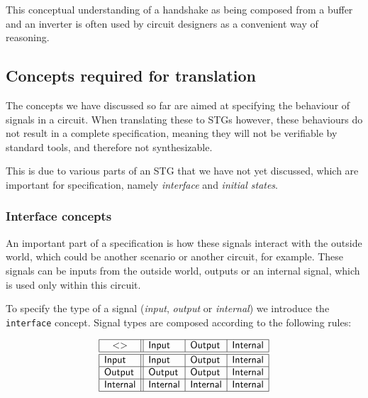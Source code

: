 \documentclass[british,conference,compsoc]{IEEEtran}
\begin{document}
This conceptual understanding of a handshake as being composed
from a buffer and an inverter is often used by circuit designers as
a convenient way of reasoning.

\vspace{-3mm}

\subsection{Concepts required for translation\label{sub:trans-concepts}}

\vspace{-2.5mm}

The concepts we have discussed so far are aimed at specifying the behaviour of 
signals in a circuit. When translating these to STGs however, these behaviours 
do not result in a complete specification, meaning they will not be 
verifiable by standard tools, and therefore not synthesizable.

This is due to various parts of an STG that we have not yet discussed, which 
are important for specification, namely \emph{interface} and 
\emph{initial states}.

\vspace{-3mm}

\subsubsection{Interface concepts\label{sub:interface}} 

An important part of a specification is how these signals interact with the 
outside world, which could be another scenario or another circuit, for example.
These signals can be inputs from the outside world, outputs or an internal 
signal, which is used only within this circuit. 

To specify the type of a signal (\emph{input},
\emph{output} or \emph{internal}) we introduce the \texttt{interface} concept.
Signal types are composed according to the following rules:

\vspace{-2mm}

\[
\begin{array}{|l||l|l|l|}
\hline
\multicolumn{1}{|c||}{<>} & \mathsf{Input} & \mathsf{Output} &
\mathsf{Internal} \\ \hline \hline
\mathsf{Input} & \mathsf{Input} & \mathsf{Output} & \mathsf{Internal} \\ \hline
\mathsf{Output} & \mathsf{Output} & \mathsf{Output} & \mathsf{Internal} \\
\hline
\mathsf{Internal}& \mathsf{Internal} & \mathsf{Internal} & \mathsf{Internal} \\
\hline
\end{array}
\]
\end{document}
